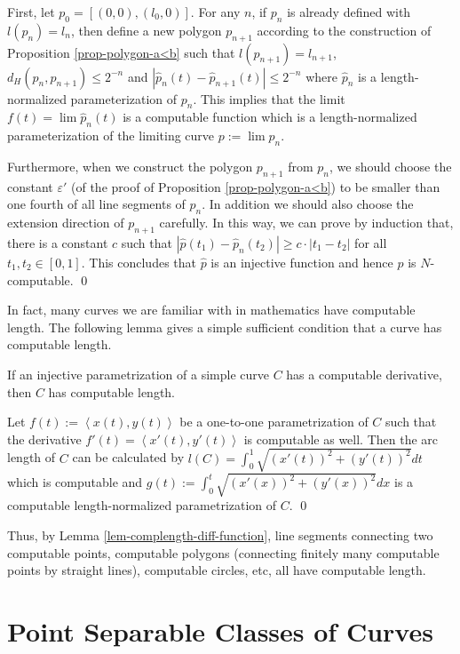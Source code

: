 \documentclass{LMCS}
\theoremstyle{plain}
\begin{document}
First, let $p_0 = [(0,0), (l_0, 0)]$. For any $n$, if $p_n$ is already defined with $l(p_n) =l_n$, then define a new polygon $p_{n+1}$ according to the construction of Proposition \ref{prop-polygon-a<b} such that $l(p_{n+1}) =l_{n+1}$, $d_H(p_n, p_{n+1}) \le 2^{-n}$ and $|\hat{p}_n(t) -\hat{p}_{n+1}(t)| \le 2^{-n}$ where $\hat{p}_n$ is a length-normalized parameterization of $p_n$. This implies that the limit $f(t) =\lim \hat{p}_n(t)$ is a computable function which is a length-normalized parameterization of the limiting curve $p:= \lim p_n$.

Furthermore, when we construct the polygon $p_{n+1}$ from $p_n$, we should choose the constant $\varepsilon'$ (of the proof of Proposition \ref{prop-polygon-a<b}) to be smaller than one fourth of all line segments of $p_n$. In addition we should also choose the extension direction of $p_{n+1}$ carefully. In this way, we can prove by induction that, there is a constant $c$ such that $|\hat{p}(t_1)- \hat{p}_n(t_2)| \ge c\cdot |t_1-t_2|$ for all $t_1, t_2 \in [0,1]$. This concludes that $\hat{p}$ is an injective function and hence $p$ is $N$-computable.
\qed

In fact, many curves we are familiar with in mathematics have computable length. The following lemma gives a simple sufficient condition that a curve has computable length.

\begin{lem}\label{lem-complength-diff-function}
If an injective parametrization of a simple curve $C$ has a computable derivative, then $C$ has computable length.
\end{lem}
\proof Let $f(t) :=\left< x(t), y(t)\right>$ be a one-to-one parametrization of $C$ such that the derivative $f'(t)=\left< x'(t), y'(t)\right>$ is computable as well. Then the arc length of $C$ can be calculated by $l(C) = \int_0^1 \sqrt{(x'(t))^2 +(y'(t))^2} dt$ which is computable and $g(t):=\int_0^t \sqrt{(x'(x))^2 +(y'(x))^2} dx$  is a computable length-normalized parametrization of $C$.
\qed

Thus, by Lemma \ref{lem-complength-diff-function},  line segments connecting two computable points, computable polygons (connecting finitely many computable points by straight lines), computable circles, etc, all have computable length.




\section{Point Separable Classes of Curves}\label{sec-point-separable}
\end{document}
